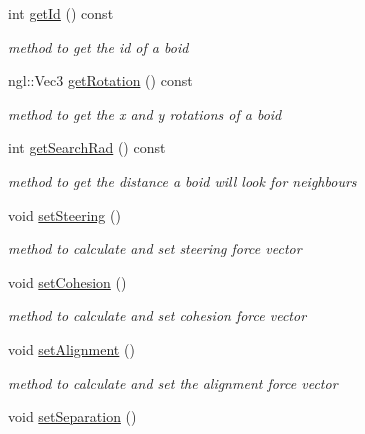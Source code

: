 \begin{DoxyCompactItemize}
\item 
int \hyperlink{classBoid_a579520e335b6033643531218eae95be0}{get\-Id} () const 
\begin{DoxyCompactList}\small\item\em method to get the id of a boid \end{DoxyCompactList}\item 
ngl\-::\-Vec3 \hyperlink{classBoid_aef5f32444ae2ae6fff812cb8272e437f}{get\-Rotation} () const 
\begin{DoxyCompactList}\small\item\em method to get the x and y rotations of a boid \end{DoxyCompactList}\item 
int \hyperlink{classBoid_ab474ff0fa3273519a0284bda734d7119}{get\-Search\-Rad} () const 
\begin{DoxyCompactList}\small\item\em method to get the distance a boid will look for neighbours \end{DoxyCompactList}\item 
\hypertarget{classBoid_aa2b619d85612051c88b2e7cc67ac0115}{void \hyperlink{classBoid_aa2b619d85612051c88b2e7cc67ac0115}{set\-Steering} ()}\label{classBoid_aa2b619d85612051c88b2e7cc67ac0115}

\begin{DoxyCompactList}\small\item\em method to calculate and set steering force vector \end{DoxyCompactList}\item 
\hypertarget{classBoid_af0fb09a2a09da233530c37466ca1e2f2}{void \hyperlink{classBoid_af0fb09a2a09da233530c37466ca1e2f2}{set\-Cohesion} ()}\label{classBoid_af0fb09a2a09da233530c37466ca1e2f2}

\begin{DoxyCompactList}\small\item\em method to calculate and set cohesion force vector \end{DoxyCompactList}\item 
\hypertarget{classBoid_a6f14922235fdd42e64a0b462113d3f16}{void \hyperlink{classBoid_a6f14922235fdd42e64a0b462113d3f16}{set\-Alignment} ()}\label{classBoid_a6f14922235fdd42e64a0b462113d3f16}

\begin{DoxyCompactList}\small\item\em method to calculate and set the alignment force vector \end{DoxyCompactList}\item 
\hypertarget{classBoid_af68e960efe0425045524acf58d681ffb}{void \hyperlink{classBoid_af68e960efe0425045524acf58d681ffb}{set\-Separation} ()}\label{classBoid_af68e960efe0425045524acf58d681ffb}


\end{DoxyCompactItemize}
